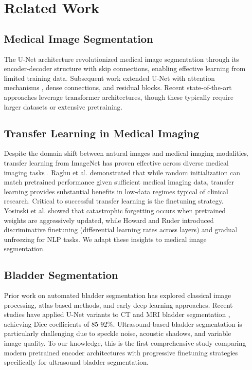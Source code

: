 \documentclass{article}
\begin{document}
\section{Related Work}

\subsection{Medical Image Segmentation}

The U-Net architecture \cite{ref7} revolutionized medical image segmentation through its encoder-decoder structure with skip connections, enabling effective learning from limited training data. Subsequent work extended U-Net with attention mechanisms \cite{ref8}, dense connections, and residual blocks. Recent state-of-the-art approaches leverage transformer architectures, though these typically require larger datasets or extensive pretraining.

\subsection{Transfer Learning in Medical Imaging}

Despite the domain shift between natural images and medical imaging modalities, transfer learning from ImageNet has proven effective across diverse medical imaging tasks \cite{ref4,ref9}. Raghu et al. \cite{ref5} demonstrated that while random initialization can match pretrained performance given sufficient medical imaging data, transfer learning provides substantial benefits in low-data regimes typical of clinical research. Critical to successful transfer learning is the finetuning strategy. Yosinski et al. \cite{ref6} showed that catastrophic forgetting occurs when pretrained weights are aggressively updated, while Howard and Ruder \cite{ref10} introduced discriminative finetuning (differential learning rates across layers) and gradual unfreezing for NLP tasks. We adapt these insights to medical image segmentation.

\subsection{Bladder Segmentation}

Prior work on automated bladder segmentation has explored classical image processing, atlas-based methods, and early deep learning approaches. Recent studies have applied U-Net variants to CT and MRI bladder segmentation \cite{ref11,ref12}, achieving Dice coefficients of 85-92\%. Ultrasound-based bladder segmentation is particularly challenging due to speckle noise, acoustic shadows, and variable image quality. To our knowledge, this is the first comprehensive study comparing modern pretrained encoder architectures with progressive finetuning strategies specifically for ultrasound bladder segmentation.
\end{document}
